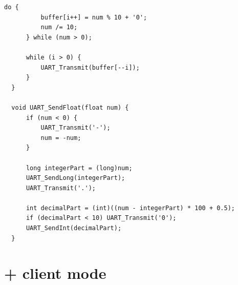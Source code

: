 \documentclass{article}
\begin{document}
\begin{lstlisting}[caption={sketch}, label={lst:example}]
      do {
          buffer[i++] = num % 10 + '0';
          num /= 10;
      } while (num > 0);
      
      while (i > 0) {
          UART_Transmit(buffer[--i]);
      }
  }
  
  void UART_SendFloat(float num) {
      if (num < 0) {
          UART_Transmit('-');
          num = -num;
      }
      
      long integerPart = (long)num;
      UART_SendLong(integerPart);
      UART_Transmit('.');
      
      int decimalPart = (int)((num - integerPart) * 100 + 0.5);
      if (decimalPart < 10) UART_Transmit('0');
      UART_SendInt(decimalPart);
  }
\end{lstlisting}

\section{+ client mode}
\end{document}
